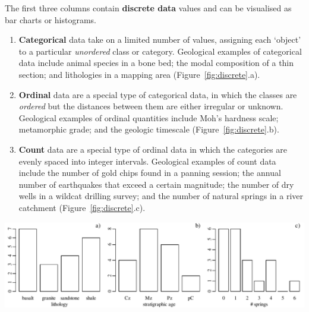 The first three columns contain \textbf{discrete data} values and can
be visualised as bar charts or histograms.

\begin{enumerate}

\item\textbf{Categorical} data take on a limited number of values,
  assigning each `object' to a particular \emph{unordered} class or
  category. Geological examples of categorical data include animal
  species in a bone bed; the modal composition of a thin section; and
  lithologies in a mapping area (Figure~\ref{fig:discrete}.a).

\item\textbf{Ordinal} data are a special type of categorical data, in
  which the classes are \emph{ordered} but the distances between them
  are either irregular or unknown. Geological examples of ordinal
  quantities include Moh's hardness scale; metamorphic grade; and the
  geologic timescale (Figure~\ref{fig:discrete}.b).

\item\textbf{Count} data are a special type of ordinal data in which
  the categories are evenly spaced into integer intervals. Geological
  examples of count data include the number of gold chips found in a
  panning session; the annual number of earthquakes that exceed a
  certain magnitude; the number of dry wells in a wildcat drilling
  survey; and the number of natural springs in a river catchment
  (Figure~\ref{fig:discrete}.c).

\end{enumerate}

\noindent\includegraphics[width=\textwidth]{../figures/discrete.pdf}\medskip
\begingroup {}
\label{fig:discrete}
\endgroup


